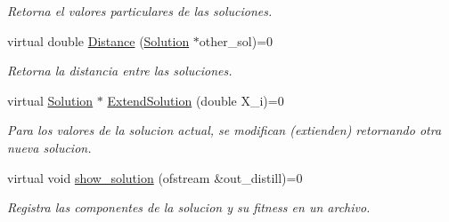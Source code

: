 \begin{DoxyCompactItemize}
\begin{DoxyCompactList}\small\item\em Retorna el valores particulares de las soluciones. \end{DoxyCompactList}\item 
\hypertarget{class_solution_aa66480352ac71f9366df6b409f99dedf}{virtual double \hyperlink{class_solution_aa66480352ac71f9366df6b409f99dedf}{Distance} (\hyperlink{class_solution}{Solution} $\ast$other\+\_\+sol)=0}\label{class_solution_aa66480352ac71f9366df6b409f99dedf}

\begin{DoxyCompactList}\small\item\em Retorna la distancia entre las soluciones. \end{DoxyCompactList}\item 
\hypertarget{class_solution_a232b4bd1064e9bae8ff4c0cbe82f6be6}{virtual \hyperlink{class_solution}{Solution} $\ast$ \hyperlink{class_solution_a232b4bd1064e9bae8ff4c0cbe82f6be6}{Extend\+Solution} (double X\+\_\+i)=0}\label{class_solution_a232b4bd1064e9bae8ff4c0cbe82f6be6}

\begin{DoxyCompactList}\small\item\em Para los valores de la solucion actual, se modifican (extienden) retornando otra nueva solucion. \end{DoxyCompactList}\item 
\hypertarget{class_solution_a57453daeb5427edff95ae110a5f6ae9b}{virtual void \hyperlink{class_solution_a57453daeb5427edff95ae110a5f6ae9b}{show\+\_\+solution} (ofstream \&out\+\_\+distill)=0}\label{class_solution_a57453daeb5427edff95ae110a5f6ae9b}

\begin{DoxyCompactList}\small\item\em Registra las componentes de la solucion y su fitness en un archivo. \end{DoxyCompactList}\end{DoxyCompactItemize}
